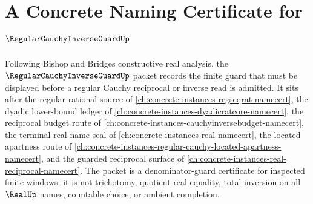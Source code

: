 \chapter{A Concrete Naming Certificate for $\RegularCauchyInverseGuardUp$}
\label{ch:concrete-instances-regular-cauchy-inverse-guard-namecert}

Following Bishop and Bridges constructive real analysis, the $\RegularCauchyInverseGuardUp$ packet records the finite guard that must be displayed before a regular Cauchy reciprocal or inverse read is admitted. It sits after the regular rational source of \autoref{ch:concrete-instances-regseqrat-namecert}, the dyadic lower-bound ledger of \autoref{ch:concrete-instances-dyadicratcore-namecert}, the reciprocal budget route of \autoref{ch:concrete-instances-cauchyinversebudget-namecert}, the terminal real-name seal of \autoref{ch:concrete-instances-real-namecert}, the located apartness route of \autoref{ch:concrete-instances-regular-cauchy-located-apartness-namecert}, and the guarded reciprocal surface of \autoref{ch:concrete-instances-real-reciprocal-namecert}. The packet is a denominator-guard certificate for inspected finite windows; it is not trichotomy, quotient real equality, total inversion on all $\RealUp$ names, countable choice, or ambient completion.

